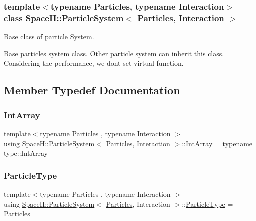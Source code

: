 \subsubsection*{template$<$typename Particles, typename Interaction$>$\newline
class Space\+H\+::\+Particle\+System$<$ Particles, Interaction $>$}

Base class of particle System. 

Base particles system class. Other particle system can inherit this class. Considering the performance, we don\textquotesingle{}t set virtual function. 

\subsection{Member Typedef Documentation}
\mbox{\label{class_space_h_1_1_particle_system_a833833592d4c4750bbfa021610e94619}} 
\subsubsection{\texorpdfstring{Int\+Array}{IntArray}}
{\footnotesize\ttfamily template$<$typename Particles , typename Interaction $>$ \\
using \mbox{\hyperlink{class_space_h_1_1_particle_system}{Space\+H\+::\+Particle\+System}}$<$ \mbox{\hyperlink{struct_space_h_1_1_particles}{Particles}}, Interaction $>$\+::\mbox{\hyperlink{class_space_h_1_1_particle_system_a833833592d4c4750bbfa021610e94619}{Int\+Array}} =  typename type\+::\+Int\+Array}

\mbox{\label{class_space_h_1_1_particle_system_af4779451c05c70a4c7812f530c9ad057}} 
\subsubsection{\texorpdfstring{Particle\+Type}{ParticleType}}
{\footnotesize\ttfamily template$<$typename Particles , typename Interaction $>$ \\
using \mbox{\hyperlink{class_space_h_1_1_particle_system}{Space\+H\+::\+Particle\+System}}$<$ \mbox{\hyperlink{struct_space_h_1_1_particles}{Particles}}, Interaction $>$\+::\mbox{\hyperlink{class_space_h_1_1_particle_system_af4779451c05c70a4c7812f530c9ad057}{Particle\+Type}} =  \mbox{\hyperlink{struct_space_h_1_1_particles}{Particles}}}

